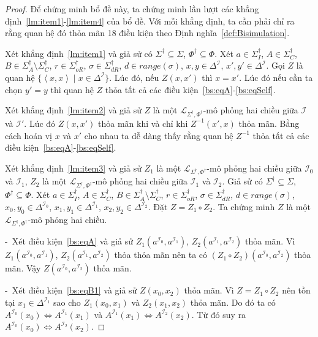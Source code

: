 \documentclass[12pt,a4paper,twoside]{report}
\newcommand{\mL}		{\mathcal{L}}
\newcommand{\mI}		{\mathcal{I}}
\newcommand{\SigmaDag}	{\Sigma^\dag}
\newcommand{\SigmaDagI}	{\Sigma^\dag_I}
\newcommand{\SigmaDagA}	{\Sigma^\dag_A}
\newcommand{\SigmaDagC}	{\Sigma^\dag_C}
\newcommand{\SigmaDagOR}{\Sigma^\dag_{oR}}
\newcommand{\SigmaDagDR}{\Sigma^\dag_{dR}}
\newcommand{\PhiDag}	{\Phi^\dag}
\newcommand{\mLSPD}		{\mL_{\Sigma^\dag,\Phi^\dag}}
\newcommand{\semiItem}	{\mbox{- }}
\newcommand{\tuple}[1]	{\left\langle#1\right\rangle\!}
\newcommand{\Range}		{\mathit{range}}
\theoremstyle{definition}
\begin{document}
\begin{proof}
Để chứng minh bổ đề này, ta chứng minh lần lượt các khẳng định~\ref{lm:item1}-\ref{lm:item4} của bổ đề. Với mỗi khẳng định, ta cần phải chỉ ra rằng quan hệ đó thỏa mãn 18 điều kiện theo Định nghĩa~\ref{def:Bisimulation}.

Xét khẳng định~\ref{lm:item1} và giả sử có $\SigmaDag \subseteq \Sigma$, $\PhiDag \subseteq \Phi$. Xét $a \in \SigmaDagI$, $A \in \SigmaDagC$, $B \in \SigmaDagA\setminus\SigmaDagC$, $r \in \SigmaDagOR$, $\sigma \in \SigmaDagDR$, $d \in \Range(\sigma)$, $x,y \in \Delta^\mI$, $x',y' \in \Delta^{\mI}$.
Gọi $Z$ là quan hệ $\{\tuple{x,x} \mid x \in \Delta^\mI\}$. Lúc đó, nếu $Z(x, x')$ thì $x = x'$. Lúc đó nếu cần ta chọn $y' = y$ thì quan hệ $Z$ thỏa tất cả các điều kiện~\eqref{bs:eqA}-\eqref{bs:eqSelf}.

Xét khẳng định~\ref{lm:item2} và giả sử $Z$ là một $\mLSPD$-mô phỏng hai chiều giữa $\mI$ và $\mI'$. Lúc đó $Z(x, x')$ thỏa mãn khi và chỉ khi $Z^{-1}(x', x)$ thỏa mãn. Bằng cách hoán vị $x$ và $x'$ cho nhau ta dễ dàng thấy rằng quan hệ $Z^{-1}$ thỏa tất cả các điều kiện~\eqref{bs:eqA}-\eqref{bs:eqSelf}.

Xét khẳng định~\ref{lm:item3} và giả sử $Z_1$ là một $\mLSPD$-mô phỏng hai chiều giữa $\mI_0$ và $\mI_1$, $Z_2$ là một $\mLSPD$-mô phỏng hai chiều giữa $\mI_1$ và $\mI_2$.
Giả sử có $\SigmaDag \subseteq \Sigma$, $\PhiDag \subseteq \Phi$. Xét $a \in \SigmaDagI$, $A \in \SigmaDagC$, $B \in \SigmaDagA\setminus\SigmaDagC$, $r \in \SigmaDagOR$, $\sigma \in \SigmaDagDR$, $d \in \Range(\sigma)$, $x_0,y_0 \in \Delta^{\mI_0}$, $x_1,y_1 \in \Delta^{\mI_1}$, $x_2,y_2 \in \Delta^{\mI_2}$. Đặt $Z = Z_1 \circ Z_2$. Ta chứng minh $Z$ là một $\mLSPD$-mô phỏng hai chiều.

\semiItem Xét điều kiện~\eqref{bs:eqA} và giả sử $Z_1(a^{\mI_0}, a^{\mI_1})$, $Z_2(a^{\mI_1}, a^{\mI_2})$ thỏa mãn. Vì $Z_1(a^{\mI_0}, a^{\mI_1})$, $Z_2(a^{\mI_1}, a^{\mI_2})$ thỏa thỏa mãn nên ta có $(Z_1 \circ Z_2)(a^{\mI_0}, a^{\mI_2})$ thỏa mãn. Vậy $Z(a^{\mI_0}, a^{\mI_2})$ thỏa mãn.

\semiItem Xét điều kiện~\eqref{bs:eqB1} và giả sử $Z(x_0, x_2)$ thỏa mãn. Vì $Z = Z_1 \circ Z_2$ nên tồn tại $x_1 \in \Delta^{\mI_1}$ sao cho $Z_1(x_0, x_1)$ và $Z_2(x_1, x_2)$ thỏa mãn. Do đó ta có $A^{\mI_0}(x_0) \Leftrightarrow A^{\mI_1}(x_1)$ và $A^{\mI_1}(x_1) \Leftrightarrow A^{\mI_2}(x_2)$. Từ đó suy ra $A^{\mI_0}(x_0) \Leftrightarrow A^{\mI_2}(x_2)$.


\end{proof}
\end{document}
